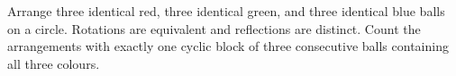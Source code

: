 Arrange three identical red, three identical green, and three identical blue balls on a circle. Rotations are equivalent and reflections are distinct. Count the arrangements with exactly one cyclic block of three consecutive balls containing all three colours.
